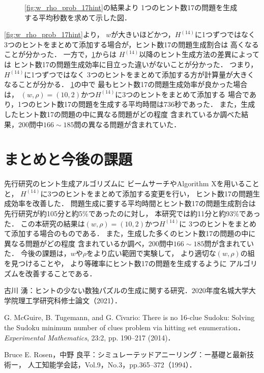 \documentclass[a4paper, 9pt]{jarticle}
\begin{document}
\begin{論文概要}
\begin{figure}[bt]
  \caption{\figurename{\ref{fig:w_rho_prob_17hint}}の結果より
  1つのヒント数17の問題を生成する平均秒数を求めて示した図．} 
  \label{fig:w_rho_efficiency_17hint}
\end{figure}
\figurename{\ref{fig:w_rho_prob_17hint}}より，
$w$が大きいほどかつ，$H^{(14)}$に1つずつではなく
3つのヒントをまとめて添加する場合が，ヒント数17の問題生成割合は
高くなることが分かった．
一方で，\figurename{\ref{fig:w_rho_efficiency_17hint}}からは
$H^{(14)}$以降のヒント生成方法の差異によっては
ヒント数17の問題生成効率に目立った違いがないことが分かった．
つまり，$H^{(14)}$に1つずつではなく
3つのヒントをまとめて添加する方が計算量が大きくなることが分かる．
\figurename{\ref{fig:w_rho_efficiency_17hint}}の中で
最もヒント数17の問題生成効率が良かった場合は，
$(w, \rho) = (10, 2)$かつ$H^{(14)}$に3つのヒントをまとめて添加する
場合であり，1つのヒント数17の問題を生成する平均時間は736秒であった．
また，生成したヒント数17の問題の中に異なる問題がどの程度
含まれているか調べた結果，200問中$166 \sim 185$問の異なる問題が含まれていた．

\section{まとめと今後の課題}
先行研究のヒント生成アルゴリズムに
ビームサーチやAlgorithm Xを用いることと，
$H^{(14)}$に3つのヒントをまとめて添加する変更を行い，
ヒント数17の問題生成効率を改善した．
問題生成に要する平均時間とヒント数17の問題生成割合は
先行研究が約105分と約5\%であったのに対し，
本研究では約11分と約93\%であった．
この本研究の結果は$(w, \rho) = (10, 2)$かつ$H^{(14)}$に
3つのヒントをまとめて添加する場合のものである．
また，生成した多くのヒント数17の問題の中に異なる問題がどの程度
含まれているか調べ，200問中$166 \sim 185$問が含まれていた．
今後の課題は，$w$や$\rho$をより広い範囲で実験して，
より適切な$(w, \rho)$の組を見つけることや，
より等確率にヒント数17の問題を生成するように
アルゴリズムを改善することである．

\begin{thebibliography}{10}

  古川 湧：ヒントの少ない数独パズルの生成に関する研究．$2020$年度名城大学大学院理工学研究科修士論文（2021）．

  G. McGuire, B. Tugemann, and G. Civario:
  There is no 16-clue Sudoku: Solving the Sudoku minimum number of clues problem via hitting set enumeration．
  {\it Experimental Mathematics}, 23:2, pp. 190--217 (2014)．

  Bruce E. Rosen，中野 良平：シミュレーテッドアニーリング：ー基礎と最新技術ー，
  人工知能学会誌，Vol.9，No.3，pp.365--372（1994）．
  

\end{thebibliography}
\end{論文概要}
\end{document}
